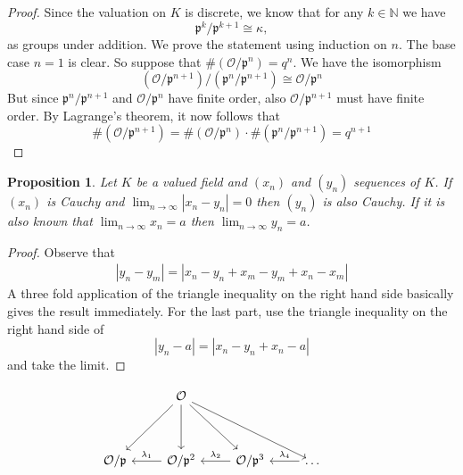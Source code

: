 \documentclass{article}
\newtheorem{proposition}{Proposition}[section]
\newcommand{\mfrak}[1]{\mathfrak{#1}}
\newcommand{\mcal}[1]{\mathcal{#1}}
\newcommand{\mbb}[1]{\mathbb{#1}}
\begin{document}
\begin{proof}
    Since the valuation on $K$ is discrete, we know that for any $k \in \mbb N$ we have $$\mfrak p^k / \mfrak p^{k+1} \cong \kappa,$$
    as groups under addition. We prove the statement using induction on $n$. The base case $n = 1$ is clear. So suppose that $\# (\mcal O / \mfrak p^n) = q^n$. We have the isomorphism
    $$(\mcal O / \mfrak p^{n+1}) / (\mfrak p^n / \mfrak p^{n+1}) \cong \mcal O / \mfrak p^{n}$$
    But since $\mfrak p^n / \mfrak p^{n+1}$ and $\mcal O / \mfrak p^{n}$ have finite order, also $\mcal O / \mfrak p^{n+1}$ must have finite order. By Lagrange's theorem, it now follows that $$\# (\mcal O / \mfrak p^{n+1}) = \# (\mcal O / \mfrak p^{n}) \cdot \# (\mfrak p^n / \mfrak p^{n+1}) = q^{n+1}$$
\end{proof}


\begin{proposition}
    Let $K$ be a valued field and $(x_n)$ and $(y_n)$ sequences of $K$. If $(x_n)$ is Cauchy and $\lim_{n \to \infty} |x_n - y_n| = 0$ then $(y_n)$ is also Cauchy. If it is also known that $\lim_{n \to \infty} x_n = a$ then $\lim_{n \to \infty} y_n = a$.
\end{proposition}

\begin{proof}
    Observe that
    \begin{align}
        |y_n - y_m| = |x_n - y_n + x_m - y_m + x_n - x_m|
    \end{align}
    A three fold application of the triangle inequality on the right hand side basically gives the result immediately. For the last part, use the triangle inequality on the right hand side of
    $$|y_n - a| = |x_n - y_n + x_n - a|$$ 
    and take the limit.
\end{proof}




\[\begin{tikzcd}
	& {\mathcal O} \\
	\\
	{\mathcal{O}/\mathfrak{p}} & {\mathcal{O}/\mathfrak{p}^2} & {\mathcal{O}/\mathfrak{p}^3} & \dots & {}
	\arrow["{\lambda_2}"', from=3-3, to=3-2]
	\arrow["{\lambda_1}"', from=3-2, to=3-1]
	\arrow["{\lambda_4}"', from=3-4, to=3-3]
	\arrow[from=1-2, to=3-4]
	\arrow[from=1-2, to=3-3]
	\arrow[from=1-2, to=3-2]
	\arrow[from=1-2, to=3-1]
\end{tikzcd}\]
\end{document}
